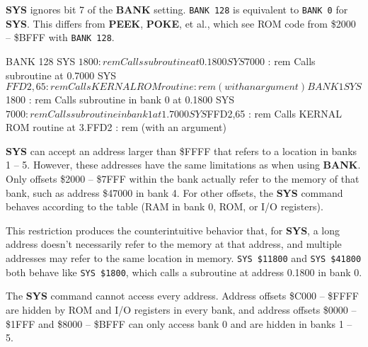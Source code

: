 {\bf SYS} ignores bit 7 of the {\bf BANK} setting. \texttt{BANK 128} is
equivalent to \texttt{BANK 0} for {\bf SYS}. This differs from {\bf PEEK},
{\bf POKE}, et al., which see ROM code from \$2000 -- \$BFFF with
\texttt{BANK 128}.

\begin{basiccode}
BANK 128
SYS $1800        : rem Calls subroutine at 0.1800
SYS $7000        : rem Calls subroutine at 0.7000
SYS $FFD2,65     : rem Calls KERNAL ROM routine
                 : rem (with an argument)

BANK 1
SYS $1800        : rem Calls subroutine in bank 0 at 0.1800
SYS $7000        : rem Calls subroutine in bank 1 at 1.7000
SYS $FFD2,65     : rem Calls KERNAL ROM routine at 3.FFD2
                 : rem (with an argument)
\end{basiccode}

{\bf SYS} can accept an address larger than \$FFFF that refers to a location
in banks 1 -- 5. However, these addresses have the same limitations as when
using {\bf BANK}. Only offsets \$2000 -- \$7FFF within the bank actually refer
to the memory of that bank, such as address \$47000 in bank 4. For other
offsets, the {\bf SYS} command behaves according to the table (RAM in bank 0,
ROM, or I/O registers).

This restriction produces the counterintuitive behavior that, for {\bf SYS}, a
long address doesn't necessarily refer to the memory at that address, and
multiple addresses may refer to the same location in memory. \texttt{SYS \$11800}
and \texttt{SYS \$41800} both behave like \texttt{SYS \$1800}, which calls a
subroutine at address 0.1800 in bank 0.


The {\bf SYS} command cannot access every address. Address offsets \$C000 --
\$FFFF are hidden by ROM and I/O registers in every bank, and address offsets
\$0000 -- \$1FFF and \$8000 -- \$BFFF can only access bank 0 and are hidden in
banks 1 -- 5.

